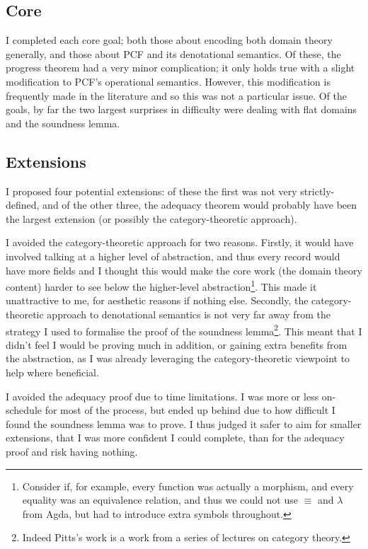\documentclass[12pt,a4paper,twoside,openright]{report}
\begin{document}
\subsection{Core}
I completed each core goal; both those about encoding both domain theory generally, and those about PCF and its denotational semantics. Of these, the progress theorem had a very minor complication; it only holds true with a slight modification to PCF's operational semantics. However, this modification is frequently made in the literature \cite{Hart} \cite{De-Jong} and so this was not a particular issue. Of the goals, by far the two largest surprises in difficulty were dealing with flat domains and the soundness lemma.
\subsection{Extensions}
I proposed four potential extensions: of these the first was not very strictly-defined, and of the other three, the adequacy theorem would probably have been the largest extension (or possibly the category-theoretic approach). 

I avoided the category-theoretic approach for two reasons. Firstly, it would have involved talking at a higher level of abstraction, and thus every record would have more fields and I thought this would make the core work (the domain theory content) harder to see below the higher-level abstraction\footnote{Consider if, for example, every function was actually a morphism, and every equality was an equivalence relation, and thus we could not use $\equiv$ and $\lambda$ from Agda, but had to introduce extra symbols throughout.}. This made it unattractive to me, for aesthetic reasons if nothing else. Secondly, the category-theoretic approach to denotational semantics is not very far away from the strategy I used to formalise the proof of the soundness lemma\footnote{Indeed Pitts's work \cite{Pitts} is a work from a series of lectures on category theory.}. This meant that I didn't feel I would be proving much in addition, or gaining extra benefits from the abstraction, as I was already leveraging the category-theoretic viewpoint to help where beneficial. 

I avoided the adequacy proof due to time limitations. I was more or less on-schedule for most of the process, but ended up behind due to how difficult I found the soundness lemma was to prove. I thus judged it safer to aim for smaller extensions, that I was more confident I could complete, than for the adequacy proof and risk having nothing. 
\end{document}
